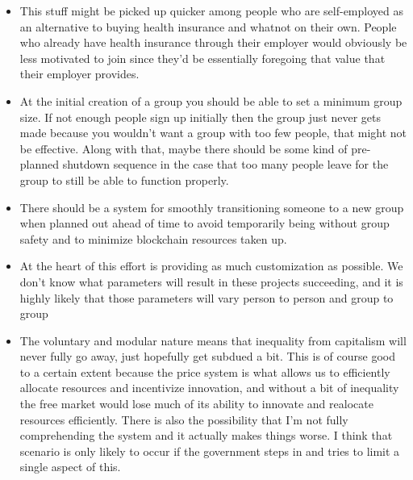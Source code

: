 \documentclass{article}[10pt]
\begin{document}
\begin{itemize}
    \item This stuff might be picked up quicker among people who are self-employed as an alternative to buying health insurance and whatnot on their own. 
    People who already have health insurance through their employer would obviously be less motivated to join since they'd be essentially foregoing that value that their employer provides.
    
    \item At the initial creation of a group you should be able to set a minimum group size. 
    If not enough people sign up initially then the group just never gets made because you wouldn't want a group with too few people, that might not be effective.
    Along with that, maybe there should be some kind of pre-planned shutdown sequence in the case that too many people leave for the group to still be able to function properly. 
    
    \item There should be a system for smoothly transitioning someone to a new group when planned out ahead of time to avoid temporarily being without group safety and to minimize blockchain resources taken up. 
    
    \item At the heart of this effort is providing as much customization as possible. 
    We don't know what parameters will result in these projects succeeding, and it is highly likely that those parameters will vary person to person and group to group
    
    \item The voluntary and modular nature means that inequality from capitalism will never fully go away, just hopefully get subdued a bit. 
    This is of course good to a certain extent because the price system is what allows us to efficiently allocate resources and incentivize innovation, and without a bit of inequality the free market would lose much of its ability to innovate and realocate resources efficiently. 
    There is also the possibility that I'm not fully comprehending the system and it actually makes things worse.
    I think that scenario is only likely to occur if the government steps in and tries to limit a single aspect of this.
    

\end{itemize}
\end{document}
